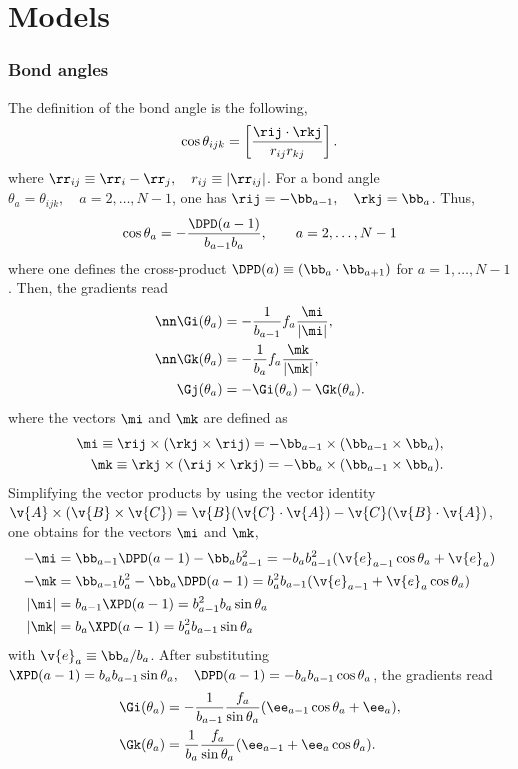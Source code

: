 \chapter{Models}

\subsection{Bond angles}

The definition of the bond angle is the following,
\begin{equation}
  \cos\theta_{ijk}=\left[\frac{\rij\cdot\rkj}{r_{ij}r_{kj}}\right].
  \label{def-bangle}
\end{equation}
where $\rr_{ij}\equiv\rr_i-\rr_j,\quad r_{ij}\equiv|\rr_{ij}|$.
For a bond angle $\theta_a=\theta_{ijk},\quad a=2,\ldots,N-1$, 
one has $\rij=-\bb_{a-1},\quad\rkj=\bb_a$. Thus,
\begin{equation}
  \cos\theta_a=-\frac{\DPD(a-1)}{b_{a-1}b_{a}},\qquad a=2,\ldots,N-1  
  \label{def-bangle-a}
\end{equation}
where one defines the cross-product 
$\DPD(a)\equiv (\bb_a\cdot\bb_{a+1})$ for $a=1,\ldots,N-1$.
Then, the gradients read
\begin{align}
  \nn\Gi(\theta_a)&=-\frac{1}{b_{a-1}}f_a\frac{\mi}{|\mi|},\\
\nn\Gk(\theta_a)&=-\frac{1}{b_{a}}
  f_a\frac{\mk}{|\mk|},\\
  \Gj(\theta_a)&=-\Gi(\theta_a)-\Gk(\theta_a).
\end{align}
where the vectors $\mi$ and $\mk$ are defined as  
\begin{align}
 \mi\equiv\rij\times(\rkj\times\rij)=-\bb_{a-1}\times(\bb_{a-1}\times\bb_{a}), \\
  \mk\equiv\rkj\times(\rij\times\rkj)=-\bb_a\times(\bb_{a-1}\times\bb_a).
\label{def-mi-mk}
\end{align}
Simplifying the vector products by using the vector identity
$\v{A}\times(\v{B}\times\v{C})=\v{B}(\v{C}\cdot{\v{A}})-\v{C}(\v{B}\cdot{\v{A}})$, 
one obtains for the vectors $\mi$ and $\mk$,
\begin{align}
  -\mi&=\bb_{a-1}\DPD(a-1)-\bb_a b_{a-1}^2=-b_ab_{a-1}^2({\v{e}_{a-1}}\cos\theta_a+\v{e}_a)\\
  -\mk&=\bb_{a-1}b_a^2-\bb_a\DPD(a-1)=b_a^2b_{a-1}(\v{e}_{a-1}+\v{e}_a\cos\theta_a)\\
  |\mi|&=b_{a-1}\XPD(a-1)=b_{a-1}^2b_a\sin\theta_a\\
  |\mk|&=b_{a}\XPD(a-1)= b_{a}^2b_{a-1}\sin\theta_a
\end{align}
with $\v{e}_a\equiv\bb_a/b_a$. 
After substituting $\XPD(a-1)=b_ab_{a-1}\sin\theta_a,\quad \DPD(a-1)=-b_ab_{a-1}\cos\theta_a$,
the gradients read
\begin{align}
  \Gi(\theta_a)&=-\frac{1}{b_{a-1}}\frac{f_a}{\sin\theta_a}(\ee_{a-1}\cos\theta_a+\ee_a),\\
  \Gk(\theta_a)&=\frac{1}{b_{a}}\frac{f_a}{\sin\theta_a}(\ee_{a-1}+\ee_a\cos\theta_a).
\end{align}

